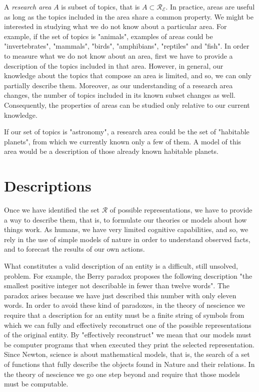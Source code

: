 A \emph{research area} $A$ is subset of topics, that is $A \subset \mathcal{R}_\mathcal{E}$. In practice, areas are useful as long as the topics included in the area share a common property. We might be interested in studying what we do not know about a particular area. For example, if the set of topics is "animals", examples of areas could be "invertebrates", "mammals", "birds", "amphibians", "reptiles" and "fish". In order to measure what we do not know about an area, first we have to provide a description of the topics included in that area. However, in general, our knowledge about the topics that compose an area is limited, and so, we can only partially describe them. Moreover, as our understanding of a research area changes, the number of topics included in its known subset changes as well. Consequently, the properties of areas can be studied only relative to our current knowledge.

\begin{example}
If our set of topics is "astronomy", a research area could be the set of "habitable planets", from which we currently known only a few of them. A model of this area would be a description of those already known habitable planets.
\end{example}

%
%

\section{Descriptions}

Once we have identified the set $\mathcal{R}$ of possible representations, we have to provide a way to describe them, that is, to formulate our theories or models about how things work. As humans, we have very limited cognitive capabilities, and so, we rely in the use of simple models of nature in order to understand observed facts, and to forecast the results of our own actions. 

What constitutes a valid description of an entity is a difficult, still unsolved, problem. For example, the Berry paradox proposes the following description "the smallest positive integer not describable in fewer than twelve words". The paradox arises because we have just described this number with only eleven words. In order to avoid these kind of paradoxes, in the theory of nescience we require that a description for an entity must be a finite string of symbols from which we can fully and effectively reconstruct one of the possible representations of the original entity. By "effectively reconstruct" we mean that our models must be computer programs that when executed they print the selected representation. Since Newton, science is about mathematical models, that is, the search of a set of functions that fully describe the objects found in Nature and their relations. In the theory of nescience we go one step beyond and require that those models must be computable.

